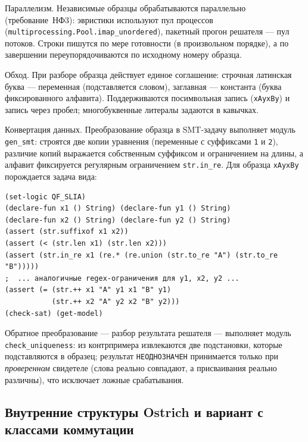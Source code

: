 \documentclass[14pt, russian]{scrartcl}
\begin{document}
Параллелизм. Независимые образцы обрабатываются параллельно (требование~НФ3):
эвристики используют пул процессов (\texttt{multiprocessing.Pool.imap\_unordered}),
пакетный прогон решателя --- пул потоков. Строки пишутся по мере готовности (в
произвольном порядке), а по завершении переупорядочиваются по исходному номеру образца.

Обход. При разборе образца действует единое соглашение: строчная латинская
буква --- переменная (подставляется словом), заглавная --- константа (буква
фиксированного алфавита). Поддерживаются посимвольная запись (\texttt{xAyxBy}) и запись
через пробел; многобуквенные литералы задаются в кавычках.

Конвертация данных. Преобразование образца в SMT-задачу выполняет модуль
\texttt{gen\_smt}: строятся две копии уравнения (переменные с суффиксами \texttt{1} и
\texttt{2}), различие копий выражается собственным суффиксом и ограничением на длины,
а алфавит фиксируется регулярным ограничением \verb|str.in_re|. Для образца
\texttt{xAyxBy} порождается задача вида:

\begin{Verbatim}[breaklines=true, fontsize=\small]
(set-logic QF_SLIA)
(declare-fun x1 () String) (declare-fun y1 () String)
(declare-fun x2 () String) (declare-fun y2 () String)
(assert (str.suffixof x1 x2))
(assert (< (str.len x1) (str.len x2)))
(assert (str.in_re x1 (re.* (re.union (str.to_re "A") (str.to_re "B")))))
;  ... аналогичные regex-ограничения для y1, x2, y2 ...
(assert (= (str.++ x1 "A" y1 x1 "B" y1)
           (str.++ x2 "A" y2 x2 "B" y2)))
(check-sat) (get-model)
\end{Verbatim}

Обратное преобразование --- разбор результата решателя --- выполняет модуль
\texttt{check\_uniqueness}: из контрпримера извлекаются две подстановки, которые
подставляются в образец; результат \texttt{НЕОДНОЗНАЧЕН} принимается только при
\textit{проверенном} свидетеле (слова реально совпадают, а присваивания реально
различны), что исключает ложные срабатывания.

\subsection{Внутренние структуры Ostrich и вариант с классами коммутации}
\label{sec:ostrich-internals}
\end{document}

